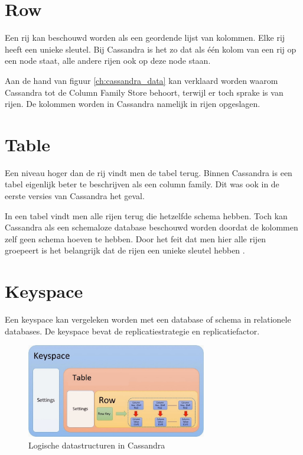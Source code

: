 \section{Row}
Een rij kan beschouwd worden als een geordende lijst van kolommen.
Elke rij heeft een unieke sleutel.
Bij Cassandra is het zo dat als één kolom van een rij op een node staat, alle andere rijen ook op deze node staan.

Aan de hand van figuur \ref{ch:cassandra_data} kan verklaard worden waarom Cassandra tot de Column Family Store behoort, terwijl er toch sprake is van rijen.
De kolommen worden in Cassandra namelijk in rijen opgeslagen.

\section{Table}
Een niveau hoger dan de rij vindt men de tabel terug.
Binnen Cassandra is een tabel eigenlijk beter te beschrijven als een column family.
Dit was ook in de eerste versies van Cassandra het geval.

In een tabel vindt men alle rijen terug die hetzelfde schema hebben.
Toch kan Cassandra als een schemaloze database beschouwd worden doordat de kolommen zelf geen schema hoeven te hebben.
Door het feit dat men hier alle rijen groepeert is het belangrijk dat de rijen een unieke sleutel hebben \citep{hewitt2010cassandra}.

\section{Keyspace}
\label{sec:keyspace}
Een keyspace kan vergeleken worden met een database of schema in relationele databases.
De keyspace bevat de replicatiestrategie en replicatiefactor.

\begin{figure}[H]
	\centering
	\includegraphics[width=0.7\textwidth]{img/4_data/data}
	\caption{Logische datastructuren in Cassandra}
	\label{fig:datastructure}
\end{figure}
